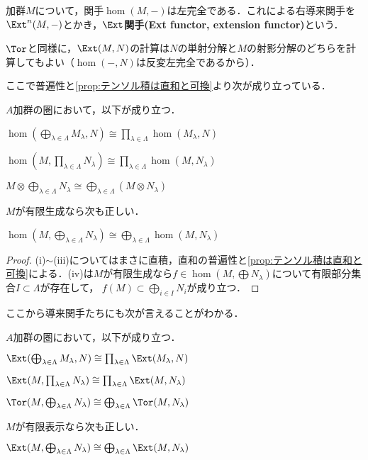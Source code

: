 \begin{defi}[$\Ext$関手]\label{defi:Ext}
	加群$M$について，関手$\hom(M,-)$は左完全である．これによる右導来関手を$\Ext^n(M,-)$とかき，$\Ext$\textbf{関手(Ext functor, extension functor)}という．
\end{defi}

$\Tor$と同様に，$\Ext(M,N)$の計算は$N$の単射分解と$M$の射影分解のどちらを計算してもよい（$\hom(-,N)$は反変左完全であるから）．

ここで普遍性と\ref{prop:テンソル積は直和と可換}より次が成り立っている．

\begin{prop}
	$A$加群の圏において，以下が成り立つ．
	\begin{sakura}
		\item $\hom(\bigoplus_{\lambda\in\Lambda} M_\lambda,N)\cong\prod_{\lambda\in\Lambda}\hom(M_\lambda,N)$
		\item $\hom(M,\prod_{\lambda\in\Lambda}N_\lambda)\cong\prod_{\lambda\in\Lambda}\hom(M,N_\lambda)$
		\item $M\otimes\bigoplus_{\lambda\in\Lambda}N_\lambda\cong\bigoplus_{\lambda\in\Lambda}(M\otimes N_\lambda)$
	\end{sakura}
	$M$が有限生成なら次も正しい．
	\begin{sakura}\setcounter{enumi}{3}
		\item $\hom(M,\bigoplus_{\lambda\in\Lambda}N_\lambda)\cong\bigoplus_{\lambda\in\Lambda}\hom(M,N_\lambda)$
	\end{sakura}
\end{prop}

\begin{proof}
	(i)$\sim$(iii)についてはまさに直積，直和の普遍性と\ref{prop:テンソル積は直和と可換}による．(iv)は$M$が有限生成なら$f\in\hom(M,\bigoplus N_\lambda)$について有限部分集合$I\subset\Lambda$が存在して， $f(M)\subset\bigoplus_{i\in I} N_i$が成り立つ．
\end{proof}

ここから導来関手たちにも次が言えることがわかる．

\begin{prop}
	$A$加群の圏において，以下が成り立つ．
	\begin{sakura}
		\item $\Ext(\bigoplus_{\lambda\in\Lambda} M_\lambda,N)\cong\prod_{\lambda\in\Lambda}\Ext(M_\lambda,N)$
		\item $\Ext(M,\prod_{\lambda\in\Lambda}N_\lambda)\cong\prod_{\lambda\in\Lambda}\Ext(M,N_\lambda)$
		\item $\Tor(M,\bigoplus_{\lambda\in\Lambda}N_\lambda)\cong\bigoplus_{\lambda\in\Lambda}\Tor(M,N_\lambda)$
	\end{sakura}
	$M$が有限表示なら次も正しい．
	\begin{sakura}\setcounter{enumi}{3}
		\item $\Ext(M,\bigoplus_{\lambda\in\Lambda}N_\lambda)\cong\bigoplus_{\lambda\in\Lambda}\Ext(M,N_\lambda)$
	\end{sakura}
\end{prop}

